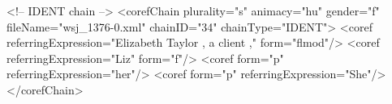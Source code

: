    <!-- IDENT chain -->
    <corefChain plurality="s" animacy="hu" gender="f" fileName="wsj_1376-0.xml" 
        chainID="34" chainType="IDENT">
        <coref referringExpression="Elizabeth Taylor , a client ," form="flmod"/>
        <coref referringExpression="Liz" form="f"/>
        <coref form="p" referringExpression="her"/>
        <coref form="p" referringExpression="She"/>
    </corefChain>